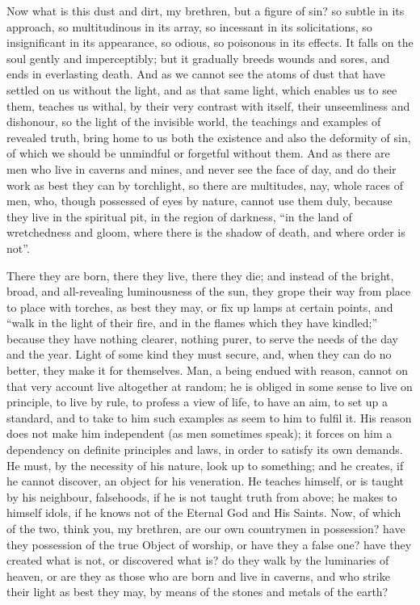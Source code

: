 Now what is this dust and dirt, my brethren, but a figure of sin?
so subtle in its approach, so multitudinous in its array, so incessant
in its solicitations, so insignificant in its appearance, so odious,
so poisonous in its effects. It falls on the soul gently and
imperceptibly; but it gradually breeds wounds and sores, and ends in
everlasting death. And as we cannot see the atoms of dust that have
settled on us without the light, and as that same light, which enables
us to see them, teaches us withal, by their very contrast with itself,
their unseemliness and dishonour, so the light of the invisible world,
the teachings and examples of revealed truth, bring home to us both
the existence and also the deformity of sin, of which we should be
unmindful or forgetful without them. And as there are men who live in
caverns and mines, and never see the face of day, and do their work as
best they can by torchlight, so there are multitudes, nay, whole races
of men, who, though possessed of eyes by nature, cannot use them duly,
because they live in the spiritual pit, in the region of darkness,
``in the land of wretchedness and gloom, where there is the shadow
of death, and where order is not''.

There they are born, there they live, there they die; and instead
of the bright, broad, and all-revealing luminousness of the sun, they
grope their way from place to place with torches, as best they may, or
fix up lamps at certain points, and ``walk in the light of their
fire, and in the flames which they have kindled;'' because they
have nothing clearer, nothing purer, to serve the needs of the day and
the year. Light of some kind they must secure, and, when they can do
no better, they make it for themselves. Man, a being endued with
reason, cannot on that very account live altogether at random; he is
obliged in some sense to live on principle, to live by rule, to
profess a view of life, to have an aim, to set up a standard, and to
take to him such examples as seem to him to fulfil it. His reason does
not make him independent (as men sometimes speak); it forces on him a
dependency on definite principles and laws, in order to satisfy its
own demands. He must, by the necessity of his nature, look up to
something; and he creates, if he cannot discover, an object for his
veneration. He teaches himself, or is taught by his neighbour,
falsehoods, if he is not taught truth from above; he makes to himself
idols, if he knows not of the Eternal God and His Saints. Now, of
which of the two, think you, my brethren, are our own countrymen in
possession? have they possession of the true Object of worship, or
have they a false one? have they created what is not, or discovered
what is? do they walk by the luminaries of heaven, or are they as
those who are born and live in caverns, and who strike their light as
best they may, by means of the stones and metals of the earth?

